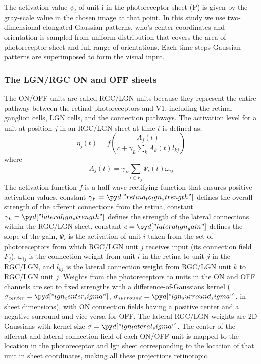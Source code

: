 \documentclass[a4paper,10pt]{article}
\begin{document}
The activation value $\psi_{i}$ of unit i in the photoreceptor sheet (P) is given by the gray-scale value in the chosen image at that point.
In this study we use two-dimensional elongated Gaussian patterns, who's center coordinates and orientation is sampled from uniform 
distribution that covers the area of photoreceptor sheet and full range of orientations. Each  time steps  Gaussian patterns are superimposed to form the visual input.

\subsubsection{The LGN/RGC ON and OFF sheets}

The ON/OFF units are called RGC/LGN units because they represent the entire pathway between the retinal photoreceptors
and V1, including the retinal ganglion cells, LGN cells, and the connection pathways. The activation level for a unit at position $j$
in an RGC/LGN sheet at time $t$ is defined as:
\begin{equation}
\eta_{j}(t)=f\left(\frac{A_{j}(t)}{c + \gamma_{L}\sum_{k}A_{k}(t)l_{kj}}\right)
\end{equation}
where
\begin{equation}
A_{j}(t) = \gamma_{F}\sum_{i\in F_j}\Psi_{i}(t)\omega_{ij}
\end{equation}
The activation function $f$ is a half-wave rectifying function that ensures positive activation values, constant $\gamma_{F}=\insval{retina_to_lgn_strength}$ defines the overall strength of the afferent connections from the retina, constant $\gamma_{L}=\insval{lateral_lgn_strength}$ defines the strength of the lateral connections within the RGC/LGN sheet, constant $c=\insval{lateral_lgn_gain}$ defines the slope of the gain, $\Psi_{i}$ is the activation of unit $i$ taken from the set of photoreceptors
from which RGC/LGN unit $j$ receives input (its connection field $F_j$), $\omega_{ij}$ is the connection weight from unit $i$ in the
retina to unit $j$ in the RGC/LGN, and $l_{kj}$ is the lateral connection weight from RGC/LGN unit $k$ to RGC/LGN unit $j$.
Weights from the photoreceptors to units in the ON and OFF channels are set to fixed strengths with a difference-of-Gaussians
kernel ($\sigma_{center}=\insval{lgn_center_sigma}$, $\sigma_{surround}=\insval{lgn_surround_sigma}$, in sheet dimensions), with ON connection fields having a positive center and a negative surround and vice versa for OFF.  The lateral RGC/LGN weights are 2D Gaussians with kernel size $\sigma=\insval{lgn_lateral_sigma}$. The center of the afferent and lateral connection field of each ON/OFF unit is mapped to the location in the photoreceptor and lgn sheet corresponding to the location of that unit in sheet coordinates, making all these projections retinotopic.
\end{document}
